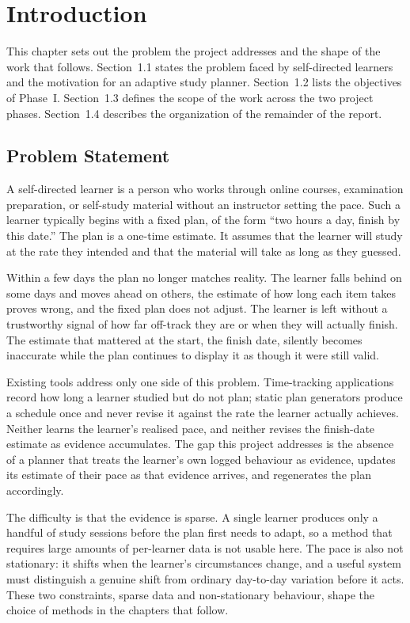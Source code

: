 \chapter{Introduction}
This chapter sets out the problem the project addresses and the shape of the work that follows. Section~1.1 states the problem faced by self-directed learners and the motivation for an adaptive study planner. Section~1.2 lists the objectives of Phase~I. Section~1.3 defines the scope of the work across the two project phases. Section~1.4 describes the organization of the remainder of the report.

\section{Problem Statement}
A self-directed learner is a person who works through online courses, examination preparation, or self-study material without an instructor setting the pace. Such a learner typically begins with a fixed plan, of the form ``two hours a day, finish by this date.'' The plan is a one-time estimate. It assumes that the learner will study at the rate they intended and that the material will take as long as they guessed.

Within a few days the plan no longer matches reality. The learner falls behind on some days and moves ahead on others, the estimate of how long each item takes proves wrong, and the fixed plan does not adjust. The learner is left without a trustworthy signal of how far off-track they are or when they will actually finish. The estimate that mattered at the start, the finish date, silently becomes inaccurate while the plan continues to display it as though it were still valid.

Existing tools address only one side of this problem. Time-tracking applications record how long a learner studied but do not plan; static plan generators produce a schedule once and never revise it against the rate the learner actually achieves. Neither learns the learner's realised pace, and neither revises the finish-date estimate as evidence accumulates. The gap this project addresses is the absence of a planner that treats the learner's own logged behaviour as evidence, updates its estimate of their pace as that evidence arrives, and regenerates the plan accordingly.

The difficulty is that the evidence is sparse. A single learner produces only a handful of study sessions before the plan first needs to adapt, so a method that requires large amounts of per-learner data is not usable here. The pace is also not stationary: it shifts when the learner's circumstances change, and a useful system must distinguish a genuine shift from ordinary day-to-day variation before it acts. These two constraints, sparse data and non-stationary behaviour, shape the choice of methods in the chapters that follow.

